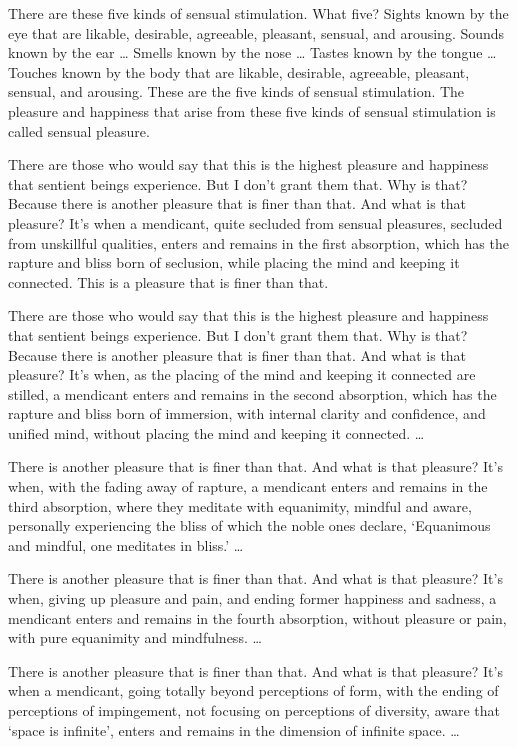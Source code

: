\documentclass[12pt,openany]{book}%
\begin{document}
There are these five kinds of sensual stimulation. What five? Sights known by the eye that are likable, desirable, agreeable, pleasant, sensual, and arousing. Sounds known by the ear … Smells known by the nose … Tastes known by the tongue … Touches known by the body that are likable, desirable, agreeable, pleasant, sensual, and arousing. These are the five kinds of sensual stimulation. The pleasure and happiness that arise from these five kinds of sensual stimulation is called sensual pleasure. 

There are those who would say that this is the highest pleasure and happiness that sentient beings experience. But I don’t grant them that. Why is that? Because there is another pleasure that is finer than that. And what is that pleasure? It’s when a mendicant, quite secluded from sensual pleasures, secluded from unskillful qualities, enters and remains in the first absorption, which has the rapture and bliss born of seclusion, while placing the mind and keeping it connected. This is a pleasure that is finer than that. 

There are those who would say that this is the highest pleasure and happiness that sentient beings experience. But I don’t grant them that. Why is that? Because there is another pleasure that is finer than that. And what is that pleasure? It’s when, as the placing of the mind and keeping it connected are stilled, a mendicant enters and remains in the second absorption, which has the rapture and bliss born of immersion, with internal clarity and confidence, and unified mind, without placing the mind and keeping it connected. … 

There is another pleasure that is finer than that. And what is that pleasure? It’s when, with the fading away of rapture, a mendicant enters and remains in the third absorption, where they meditate with equanimity, mindful and aware, personally experiencing the bliss of which the noble ones declare, ‘Equanimous and mindful, one meditates in bliss.’ … 

There is another pleasure that is finer than that. And what is that pleasure? It’s when, giving up pleasure and pain, and ending former happiness and sadness, a mendicant enters and remains in the fourth absorption, without pleasure or pain, with pure equanimity and mindfulness. … 

There is another pleasure that is finer than that. And what is that pleasure? It’s when a mendicant, going totally beyond perceptions of form, with the ending of perceptions of impingement, not focusing on perceptions of diversity, aware that ‘space is infinite’, enters and remains in the dimension of infinite space. … 
\end{document}
